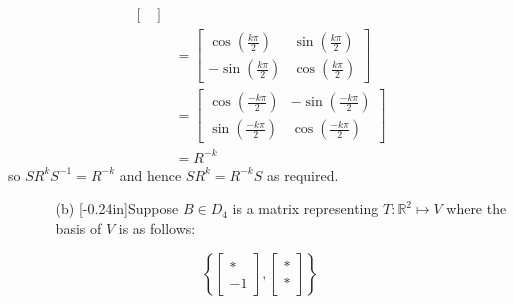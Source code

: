 \documentclass[letterpaper,12pt]{article}
\newcommand{\set}[1]{\left\{ #1 \right\}}
\theoremstyle{definition}
\begin{document}
\begin{enumerate}
\begin{mdframed}
\begin{align*}
\begin{bmatrix}
        \end{bmatrix} \\
         &=  \begin{bmatrix}
            \cos \left (\frac{k\pi}{2} \right ) & \sin \left (\frac{k\pi}{2} \right ) \\ -\sin \left (\frac{k\pi}{2} \right ) & \cos \left (\frac{k\pi}{2} \right )
        \end{bmatrix} \\
          &=  \begin{bmatrix}
            \cos \left (\frac{-k\pi}{2} \right ) & -\sin \left (\frac{-k\pi}{2} \right ) \\ \sin \left (\frac{-k\pi}{2} \right ) & \cos \left (\frac{-k\pi}{2} \right )
        \end{bmatrix} \\
        &= R^{-k}
        \end{align*}
        so $SR^k S^{-1} = R^{-k}$ and hence $SR^k = R^{-k}S$ as required.
    \end{mdframed}
\end{enumerate}
\pagebreak
\begin{enumerate}
\item[] \begin{enumerate}
    \item[(b)]\reversemarginpar{}[-0.24in]Suppose $B \in D_4$ is a matrix representing $T: \mathbb{R}^2 \mapsto V$ where the basis of $V$ is as follows:
    \end{enumerate}
   \end{enumerate}
   $$\set{\begin{bmatrix}
      * \\ -1
   \end{bmatrix},\begin{bmatrix}
      * \\ *
   \end{bmatrix}}$$
\end{document}
